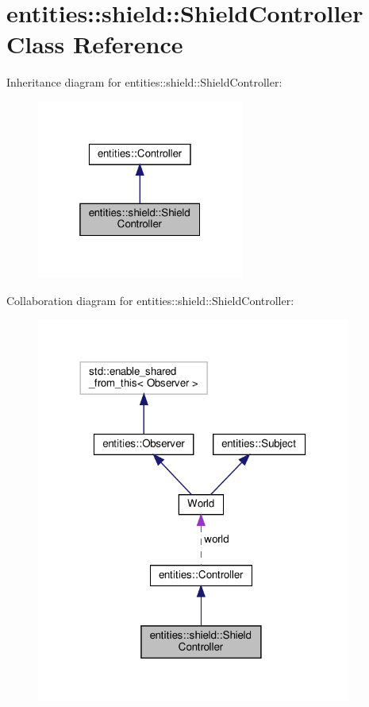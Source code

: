 \hypertarget{classentities_1_1shield_1_1ShieldController}{}\section{entities\+:\+:shield\+:\+:Shield\+Controller Class Reference}
\label{classentities_1_1shield_1_1ShieldController}


Inheritance diagram for entities\+:\+:shield\+:\+:Shield\+Controller\+:\nopagebreak
\begin{figure}[H]
\begin{center}
\leavevmode
\includegraphics[width=193pt]{classentities_1_1shield_1_1ShieldController__inherit__graph}
\end{center}
\end{figure}


Collaboration diagram for entities\+:\+:shield\+:\+:Shield\+Controller\+:\nopagebreak
\begin{figure}[H]
\begin{center}
\leavevmode
\includegraphics[width=293pt]{classentities_1_1shield_1_1ShieldController__coll__graph}
\end{center}
\end{figure}
